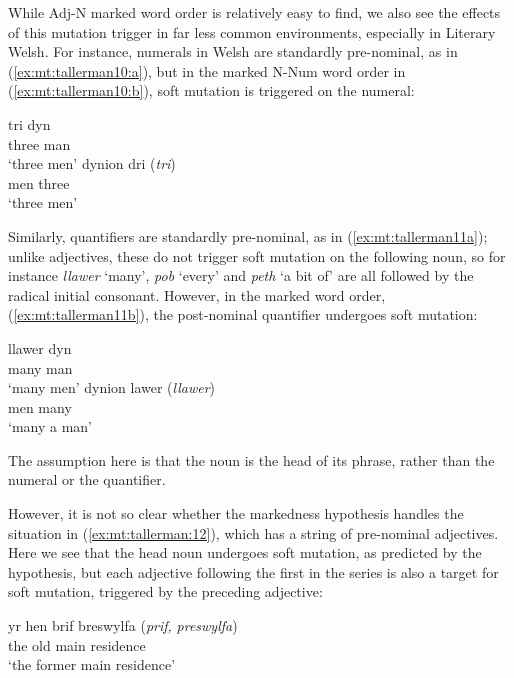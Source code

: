 \documentclass[output=paper,colorlinks,citecolor=brown]{langscibook}
\begin{document}
While Adj-N marked word order is relatively easy to find, we also see the effects of this mutation trigger in far less common environments, especially in Literary Welsh. For instance, numerals in Welsh are standardly pre-nominal, as in (\ref{ex:mt:tallerman10:a}), but in the marked N-Num word order in (\ref{ex:mt:tallerman10:b}), soft mutation is triggered on the numeral:

\ea\label{ex:mt:tallerman10}
\ea\label{ex:mt:tallerman10:a}
\gll tri dyn \\
three man\\ 
\glt ‘three men’
\ex\label{ex:mt:tallerman10:b}
\gll dynion dri    (\textit{tri}) \\
men three\\ 
\glt‘three men’
\z
\z

Similarly, quantifiers are standardly pre-nominal, as in (\ref{ex:mt:tallerman11a}); unlike adjectives, these do not trigger soft mutation on the following noun, so for instance \textit{llawer} ‘many’, \textit{pob} ‘every’ and \textit{peth} ‘a bit of’ are all followed by the radical initial consonant. However, in the marked word order, (\ref{ex:mt:tallerman11b}), the post-nominal quantifier undergoes soft mutation:

\ea\label{ex:mt:tallerman11}
\ea\label{ex:mt:tallerman11a}
\gll llawer dyn\\
many man\\ 
\glt ‘many men’
\ex\label{ex:mt:tallerman11b}
\gll dynion lawer     (\textit{llawer}) \\
men many\\ 
\glt ‘many a man’
\z
\z

\noindent The assumption here is that the noun is the head of its phrase, rather than the numeral or the quantifier. 

However, it is not so clear whether the markedness hypothesis handles the situation in (\ref{ex:mt:tallerman:12}), which has a string of pre-nominal adjectives. Here we see that the head noun undergoes soft mutation, as predicted by the hypothesis, but each adjective following the first in the series is also a target for soft mutation, triggered by the preceding adjective:

\ea\label{ex:mt:tallerman:12}
\gll yr hen brif breswylfa    (\textit{prif,} {\textit{preswylfa}})\\
the old main residence\\
\glt ‘the former main residence’
\z
\end{document}

